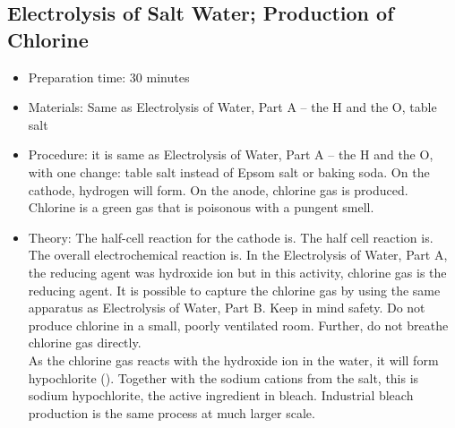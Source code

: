 \subsection{Electrolysis of Salt Water; Production of Chlorine}
\begin{itemize}
\item{Preparation time: 30 minutes}
\item{Materials: Same as Electrolysis of Water, Part A -- the H and the O, table salt}
\item{Procedure:  it is same as Electrolysis of Water, Part A -- the H and the O, with one change: table salt instead of Epsom salt or baking soda. On the cathode, hydrogen will form. On the anode, chlorine gas is produced. Chlorine is a green gas that is poisonous with a pungent smell.}
\item{Theory: The half-cell reaction for the cathode is. The half cell reaction is. The overall electrochemical reaction is. In the Electrolysis of Water, Part A, the reducing agent was hydroxide ion but in this activity, chlorine gas is the reducing agent. It is possible to capture the chlorine gas by using the same apparatus as Electrolysis of Water, Part B. Keep in mind safety. Do not produce chlorine in a small, poorly ventilated room. Further, do not breathe chlorine gas directly.\\
As the chlorine gas reacts with the hydroxide ion in the water, it will form hypochlorite (). Together with the sodium cations from the salt, this is sodium hypochlorite, the active ingredient in bleach. Industrial bleach production is the same process at much larger scale.}
\end{itemize}

